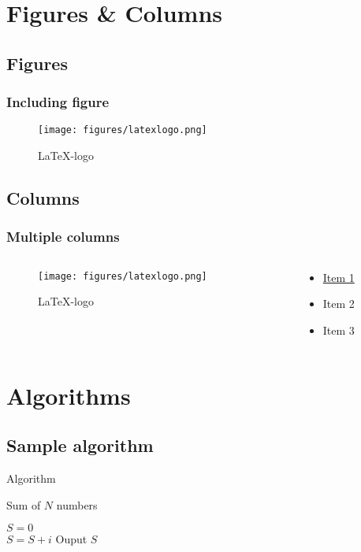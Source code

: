 \documentclass[aspectratio=169]{beamer}
\begin{document}
\section{Figures \& Columns}
\subsection{Figures}
\begin{frame}
	\frametitle{Including figure}
	\begin{figure}
		\centering
		\texttt{[image: figures/latexlogo.png]}
		\caption{\LaTeX-logo}
        \citep{stallman1981emacs} %
	\end{figure}
\end{frame}

\subsection{Columns}
\begin{frame}
	\frametitle{Multiple columns}
	\begin{columns}
		\begin{column}{0.5\paperwidth}
		 \begin{figure}
			\centering
			\texttt{[image: figures/latexlogo.png]}
			\caption{\LaTeX-logo}
			\end{figure}
		\end{column}
		\begin{column}{0.5\paperwidth}
		 \begin{itemize}
			\item \hyperlink{label1}{Item 1} %
			\item Item 2
			\item Item 3
		 \end{itemize}
		\end{column}	
	\end{columns}
\end{frame}

\section{Algorithms}
\subsection{Sample algorithm}
\begin{frame}[label =label1]{Algorithm} %
	\begin{algorithm}[H]
		\caption{Sum of $N$ numbers}
		$S = 0$\\
		{
			$S = S + i$
		}
		Ouput $S$
	\end{algorithm}
\end{frame}
\end{document}
